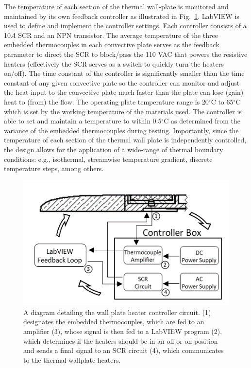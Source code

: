 The temperature of each section of the thermal wall-plate is monitored and maintained by its own feedback controller as illustrated in Fig.~\ref{fig:tempcontrol}.  LabVIEW is used to define and implement the controller settings. Each controller consists of a 10$A$ SCR and an NPN transistor. The average temperature of the three embedded thermocouples in each convective plate serves as the feedback parameter to direct the SCR to block/pass the 110 VAC that powers the resistive heaters (effectively the SCR serves as a switch to quickly turn the heaters on/off). The time constant of the controller is significantly smaller than the time constant of any given convective plate so the controller can monitor and adjust the heat-input to the convective plate much faster than the plate can lose (gain) heat to (from) the flow. The operating plate temperature range is 20$^\circ$C to 65$^\circ$C which is set by the working temperature of the materials used. The controller is able to set and maintain a temperature to within 0.5$^\circ$C as determined from the variance of the embedded thermocouples during testing. Importantly, since the temperature of each section of the thermal wall plate is independently controlled, the design allows for the application of a wide-range of thermal boundary conditions: e.g., isothermal, streamwise temperature gradient, discrete temperature steps, among others.

\begin{figure}[h!]
\centering
\includegraphics[scale=1]{figures/facility/circuit_diagram_v2.png}
\caption{{\footnotesize A diagram detailing the wall plate heater controller circuit. (1) designates the embedded thermocouples, which are fed to an amplifier (3), whose signal is then fed to a LabVIEW program (2), which determines if the heaters should be in an off or on position and sends a final signal to an SCR circuit (4), which communicates to the thermal wallplate heaters.
}}
\label{fig:tempcontrol}
\end{figure}

